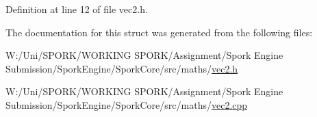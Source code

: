 Definition at line 12 of file vec2.\+h.



The documentation for this struct was generated from the following files\+:\begin{DoxyCompactItemize}
\item 
W\+:/\+Uni/\+S\+P\+O\+R\+K/\+W\+O\+R\+K\+I\+N\+G S\+P\+O\+R\+K/\+Assignment/\+Spork Engine Submission/\+Spork\+Engine/\+Spork\+Core/src/maths/\hyperlink{vec2_8h}{vec2.\+h}\item 
W\+:/\+Uni/\+S\+P\+O\+R\+K/\+W\+O\+R\+K\+I\+N\+G S\+P\+O\+R\+K/\+Assignment/\+Spork Engine Submission/\+Spork\+Engine/\+Spork\+Core/src/maths/\hyperlink{vec2_8cpp}{vec2.\+cpp}\end{DoxyCompactItemize}
